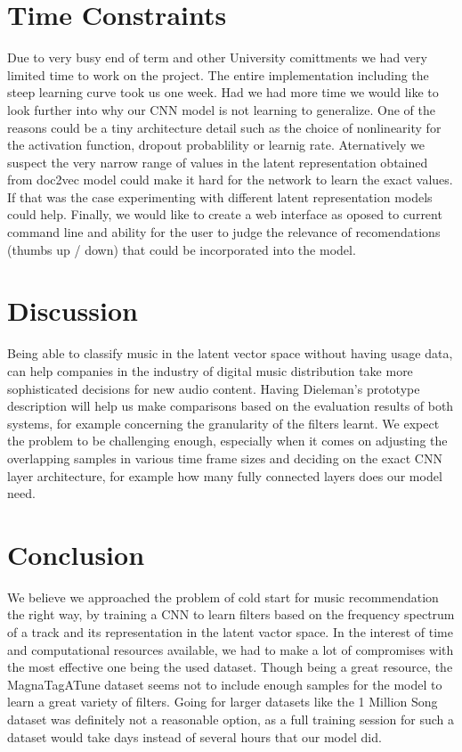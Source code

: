 \documentclass[11pt, a4paper]{article}
\begin{document}
  \section{Time Constraints}
    Due to very busy end of term and other University comittments we had very
    limited time to work on the project. The entire implementation including
    the steep learning curve took us one week. Had we had more time we would
    like to look further into why our CNN model is not learning to generalize.
    One of the reasons could be a tiny architecture detail such as the choice
    of nonlinearity for the activation function, dropout probablility or
    learnig rate. Aternatively we suspect the very narrow range of values in
    the latent representation obtained from doc2vec model could make it hard
    for the network to learn the exact values. If that was the case
    experimenting with different latent representation models could help.
    Finally, we would like to create a web interface as oposed to current
    command line and ability for the user to judge the relevance of
    recomendations (thumbs up / down) that could be incorporated into the
    model.
    
  \section{Discussion}
    Being able to classify music in the latent vector space without having
    usage data, can help companies in the industry of digital music
    distribution take more sophisticated decisions for new audio content.
    Having Dieleman's prototype description will help us make comparisons based
    on the evaluation results of both systems, for example concerning the
    granularity of the filters learnt. We expect the problem to be challenging
    enough, especially when it comes on adjusting the overlapping samples in
    various time frame sizes and deciding on the exact CNN layer architecture,
    for example how many fully connected layers does our model need.
  \section{Conclusion}
    We believe we approached the problem of cold start for music recommendation
    the right way, by training a CNN to learn filters based on the frequency
    spectrum of a track and its representation in the latent vactor space. In
    the interest of time and computational resources available, we had to make
    a lot of compromises with the most effective one being the used dataset.
    Though being a great resource, the MagnaTagATune dataset seems not to
    include enough samples for the model to learn a great variety of filters.
    Going for larger datasets like the 1 Million Song dataset was definitely
    not a reasonable option, as a full training session for such a dataset
    would take days instead of several hours that our model did.
\end{document}
